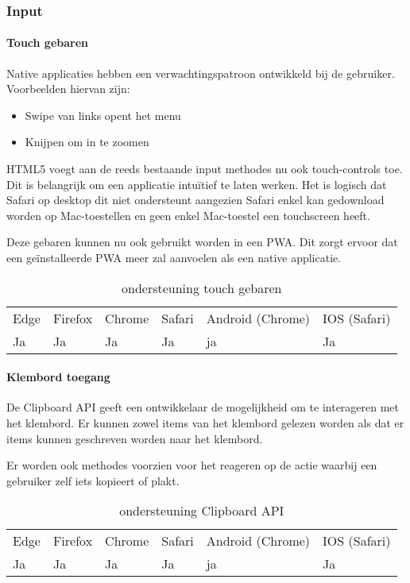 \subsubsection{Input}

\paragraph{Touch gebaren}

Native applicaties hebben een verwachtingspatroon ontwikkeld bij de gebruiker. Voorbeelden hiervan zijn:

 \begin{itemize}
	\item	Swipe van links opent het menu
	\item	Knijpen om in te zoomen
\end{itemize}

HTML5 voegt aan de reeds bestaande input methodes nu ook touch-controls toe. Dit is belangrijk om een applicatie intuïtief te laten werken. Het is logisch dat Safari op desktop dit niet ondersteunt aangezien Safari enkel kan gedownload worden op Mac-toestellen en geen enkel Mac-toestel een touchscreen heeft.

Deze gebaren kunnen nu ook gebruikt worden in een PWA. Dit zorgt ervoor dat een geïnstalleerde PWA meer zal aanvoelen als een native applicatie.

\begin{table}[]
	\begin{tabular}{llllll}
		Edge & Firefox & Chrome & Safari & Android (Chrome) & IOS (Safari) \\
		Ja   & Ja      &  Ja     & Ja     & ja               & Ja          
	\end{tabular}	
	\caption{ondersteuning touch gebaren}
	\label{ondersteuning touch gebaren}
\end{table}	

\paragraph{Klembord toegang}
De Clipboard API \autocite{Kacmarcik2020} geeft een ontwikkelaar de mogelijkheid om te interageren met het klembord. Er kunnen zowel items van het klembord gelezen worden als dat er items kunnen geschreven worden naar het klembord.

Er worden ook methodes voorzien voor het reageren op de actie waarbij een gebruiker zelf iets kopieert of plakt. 

\begin{table}[]
	\begin{tabular}{llllll}
		Edge & Firefox & Chrome & Safari & Android (Chrome) & IOS (Safari) \\
		Ja   & Ja      &  Ja     & Ja     & ja               & Ja          
	\end{tabular}	
	\caption{ondersteuning Clipboard API}
	\label{ondersteuning Clipboard API}
\end{table}	




